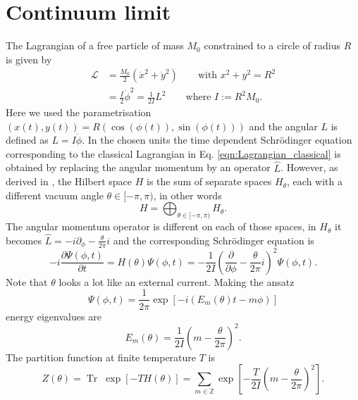 \documentclass[11pt]{article}
\begin{document}
\section{Continuum limit}
The Lagrangian of a free particle of mass $M_0$ constrained to a circle of radius $R$ is given by
\begin{equation}
\begin{aligned}
  \mathcal{L} &= \frac{M_0}{2}\left(\dot{x}^2+\dot{y}^2\right)\qquad\text{with $x^2+y^2=R^2$}\\
&= \frac{I}{2}\dot{\phi}^2=\frac{1}{2I} L^2 \qquad{\text{where $I:=R^2M_0$}}.
\end{aligned}
\label{eqn:Lagrangian_classical}
\end{equation}
Here we used the parametrisation $(x(t),y(t))=R(\cos(\phi(t)),\sin(\phi(t)))$ and the angular $L$ is defined as $L=I\dot{\phi}$. In the chosen units the time dependent Schr\"{o}dinger equation corresponding to the classical Lagrangian in Eq. \eqref{eqn:Lagrangian_classical} is obtained by replacing the angular momentum by an operator $\hat{L}$. However, as derived in \cite{Tanimura1994}, the Hilbert space $H$ is the sum of separate spaces $H_\theta$, each with a different vacuum angle $\theta\in[-\pi,\pi)$, in other words
  \begin{equation}
    H=\bigoplus_{\theta\in[-\pi,\pi)} H_\theta.
  \end{equation}
  The angular momentum operator is different on each of those spaces, in $H_\theta$ it becomes $\hat{L}=-i\partial_\phi-\frac{\theta}{2\pi}i$ and the corresponding Schr\"{o}dinger equation is
\begin{equation}
  -i\frac{\partial{\Psi(\phi,t)}}{\partial t} = H(\theta)\Psi(\phi,t)=-\frac{1}{2I} \left(\frac{\partial}{\partial \phi}-\frac{\theta}{2\pi}i\right)^2\Psi(\phi,t).\label{eqn:Schroedinger}
\end{equation}
Note that $\theta$ looks a lot like an external current. Making the ansatz
\begin{equation}
  \Psi(\phi,t) = \frac{1}{2\pi}\exp\left[-i(E_m(\theta)t-m\phi)\right]
\end{equation}
energy eigenvalues are
\begin{equation}
  E_m(\theta) = \frac{1}{2I}\left(m-\frac{\theta}{2\pi}\right)^2.
\end{equation}
The partition function at finite temperature $T$ is
\begin{equation}
  Z(\theta) = \operatorname{Tr}\;\exp\left[-TH(\theta)\right]
  = \sum_{m\in\mathbb{Z}} \exp\left[-\frac{T}{2I}\left(m-\frac{\theta}{2\pi}\right)^2\right].
\end{equation}
\end{document}
